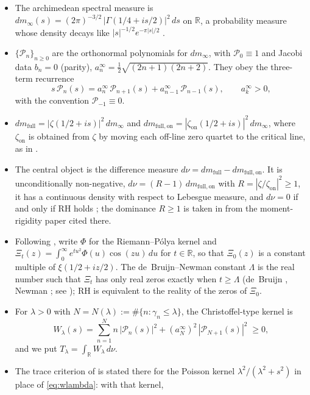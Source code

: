 \documentclass[11pt]{amsart}
\theoremstyle{definition}
\theoremstyle{remark}
\newcommand{\bbR}{\mathbb{R}}
\newcommand{\dm}{dm_\infty}
\newcommand{\dmfull}{dm_{\mathrm{full}}}
\newcommand{\dmon}{dm_{\mathrm{full,on}}}
\newcommand{\dnu}{d\nu}
\newcommand{\Wl}{W_\lambda}
\newcommand{\Tl}{T_\lambda}
\begin{document}
\begin{itemize}
\item The archimedean spectral measure is
$\dm(s)=(2\pi)^{-3/2}\,|\Gamma(1/4+is/2)|^2\,ds$ on $\bbR$, a probability measure whose
density decays like $|s|^{-1/2}e^{-\pi|s|/2}$ \cite[Def.~2.1]{P24}.
\item $\{\mathcal{P}_n\}_{n\geq0}$ are the orthonormal polynomials for
$\dm$, with $\mathcal{P}_0\equiv1$ and Jacobi data $b_n=0$ (parity),
$a_n^\infty=\tfrac12\sqrt{(2n+1)(2n+2)}$. They obey the three-term
recurrence
\begin{equation}\label{eq:ttr}
s\,\mathcal{P}_n(s)=a_n^\infty\,\mathcal{P}_{n+1}(s)+a_{n-1}^\infty\,\mathcal{P}_{n-1}(s),
\qquad a_k^\infty>0,
\end{equation}
with the convention $\mathcal P_{-1}\equiv0$.
\item $\dmfull=|\zeta(1/2+is)|^2\,\dm$ and $\dmon=|\zeta_{\mathrm{on}}(1/2+is)|^2\,\dm$,
where $\zeta_{\mathrm{on}}$ is obtained from $\zeta$ by moving each off-line zero quartet to the
critical line, as in \cite[Def.~2.1]{P24}.
\item The central object is the difference measure $\dnu=\dmfull-\dmon$. It is unconditionally
non-negative, $\dnu=(R-1)\,\dmon$ with $R=|\zeta/\zeta_{\mathrm{on}}|^2\geq1$, it has a
continuous density with respect to Lebesgue measure, and $\dnu=0$ if and only if RH holds
\cite[Thm.~3.1, Cor.~3.2]{P24}; the dominance $R\ge1$ is taken in \cite{P24} from the
moment-rigidity paper cited there.
\item Following \cite{P13}, write $\Phi$ for the Riemann--P\'olya kernel and
$\Xi_t(z)=\int_0^\infty e^{tu^2}\Phi(u)\cos(zu)\,du$ for $t\in\bbR$, so that
$\Xi_0(z)$ is a constant multiple of $\xi(1/2+iz/2)$. The de~Bruijn--Newman constant $\Lambda$ is
the real number such that $\Xi_t$ has only real zeros exactly when $t\ge\Lambda$ (de~Bruijn
\cite{dB}, Newman \cite{New76}; see \cite{P13}); RH is equivalent to the reality of the zeros of $\Xi_0$.
\item For $\lambda>0$ with $N=N(\lambda):=\#\{n:\gamma_n\leq\lambda\}$, the Christoffel-type
kernel is
\begin{equation}\label{eq:wlambda}
\Wl(s)=\sum_{n=1}^{N} n\,|\mathcal{P}_n(s)|^2+(a_N^\infty)^2\,|\mathcal{P}_{N+1}(s)|^2\;\geq0,
\end{equation}
and we put $\Tl=\int_\bbR \Wl\,\dnu$.
\item The trace criterion of \cite[Thm.~5.3]{P24} is stated there for the Poisson kernel
$\lambda^2/(\lambda^2+s^2)$ in place of \eqref{eq:wlambda}: with that kernel,

\end{itemize}
\end{document}
